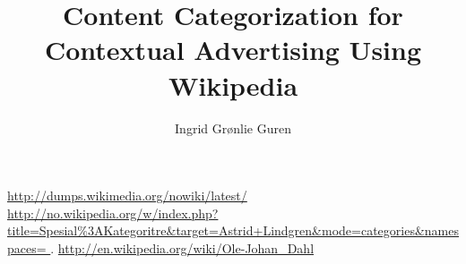 \documentclass[a4paper,english]{book}
\title{Content Categorization for Contextual Advertising Using Wikipedia}
\author{Ingrid Grønlie Guren}
\begin{document}

\ififorside
\frontmatter{}
\maketitle{}


\urldef\nowikidump\url{http://dumps.wikimedia.org/nowiki/latest/}
\urldef\categorytree\url{http://no.wikipedia.org/w/index.php?title=Spesial%3AKategoritre&target=Astrid+Lindgren&mode=categories&namespaces= }.
\urldef\olejohandahleng\url{http://en.wikipedia.org/wiki/Ole-Johan_Dahl}



  
\tableofcontents{}
\listoffigures{}
\listoftables{}

\mainmatter{}














\end{document}

